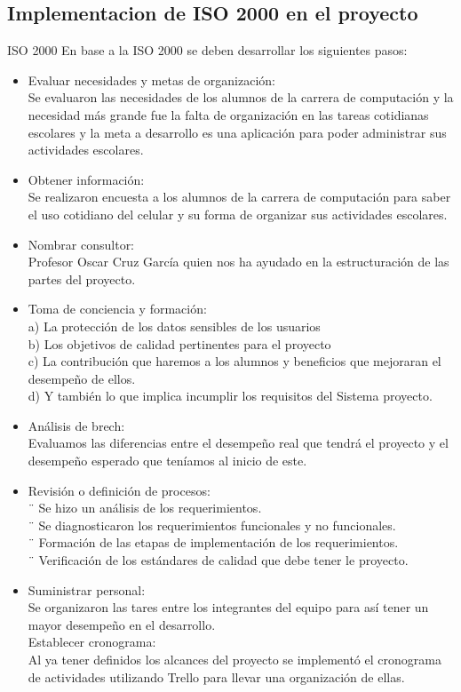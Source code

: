 \documentclass[10pt]{article}
\begin{document}
\subsection{Implementacion de ISO 2000 en el proyecto}
\justify
ISO 2000
En base a la ISO 2000 se deben desarrollar los siguientes pasos:\\
\begin{itemize}
    \item Evaluar necesidades y metas de organización:\\ Se evaluaron las necesidades de
          los alumnos de la carrera de computación y la necesidad más grande fue la falta
          de organización en las tareas cotidianas escolares y la meta a desarrollo es
          una aplicación para poder administrar sus actividades escolares.
    \item Obtener información:\\ Se realizaron encuesta a los alumnos de la carrera de
          computación para saber el uso cotidiano del celular y su forma de organizar sus
          actividades escolares.
    \item Nombrar consultor:\\ Profesor Oscar Cruz García quien nos ha ayudado en la
          estructuración de las partes del proyecto.
    \item Toma de conciencia y formación:\\ a) La protección de los datos sensibles de
          los usuarios\\ b) Los objetivos de calidad pertinentes para el proyecto\\ c) La
          contribución que haremos a los alumnos y beneficios que mejoraran el desempeño
          de ellos.\\ d) Y también lo que implica incumplir los requisitos del Sistema
          proyecto.
    \item Análisis de brech:\\ Evaluamos las diferencias entre el desempeño real que
          tendrá el proyecto y el desempeño esperado que teníamos al inicio de este.
    \item Revisión o definición de procesos:\\ ¨ Se hizo un análisis de los
          requerimientos.\\ ¨ Se diagnosticaron los requerimientos funcionales y no
          funcionales.\\ ¨ Formación de las etapas de implementación de los
          requerimientos.\\ ¨ Verificación de los estándares de calidad que debe tener le
          proyecto.
    \item Suministrar personal:\\ Se organizaron las tares entre los integrantes del
          equipo para así tener un mayor desempeño en el desarrollo.\\ Establecer
          cronograma:\\ Al ya tener definidos los alcances del proyecto se implementó el
          cronograma de actividades utilizando Trello para llevar una organización de
          ellas.
\end{itemize}
\end{document}
